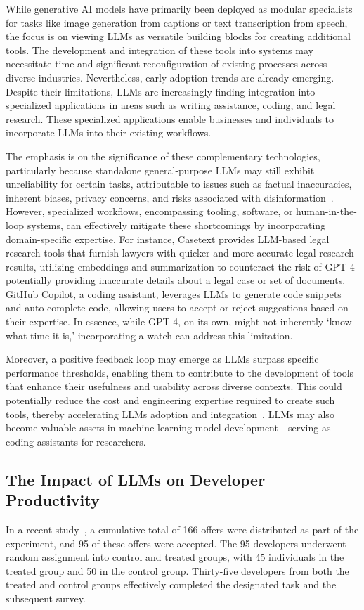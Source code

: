 \documentclass[12pt]{extarticle}
\begin{document}
While generative AI models have primarily been deployed as modular specialists for tasks like image generation from captions or text transcription from speech, the focus is on viewing LLMs as versatile building blocks for creating additional tools. The development and integration of these tools into systems may necessitate time and significant reconfiguration of existing processes across diverse industries. Nevertheless, early adoption trends are already emerging. Despite their limitations, LLMs are increasingly finding integration into specialized applications in areas such as writing assistance, coding, and legal research. These specialized applications enable businesses and individuals to incorporate LLMs into their existing workflows.

The emphasis is on the significance of these complementary technologies, particularly because standalone general-purpose LLMs may still exhibit unreliability for certain tasks, attributable to issues such as factual inaccuracies, inherent biases, privacy concerns, and risks associated with disinformation~\cite{abid2021persistent, schramowski2022large, goldstein2023generative}. However, specialized workflows, encompassing tooling, software, or human-in-the-loop systems, can effectively mitigate these shortcomings by incorporating domain-specific expertise. For instance, Casetext provides LLM-based legal research tools that furnish lawyers with quicker and more accurate legal research results, utilizing embeddings and summarization to counteract the risk of GPT-4 potentially providing inaccurate details about a legal case or set of documents. GitHub Copilot, a coding assistant, leverages LLMs to generate code snippets and auto-complete code, allowing users to accept or reject suggestions based on their expertise. In essence, while GPT-4, on its own, might not inherently `know what time it is,' incorporating a watch can address this limitation.

Moreover, a positive feedback loop may emerge as LLMs surpass specific performance thresholds, enabling them to contribute to the development of tools that enhance their usefulness and usability across diverse contexts. This could potentially reduce the cost and engineering expertise required to create such tools, thereby accelerating LLMs adoption and integration~\cite{chen2021evaluating, peng2023impact}. LLMs may also become valuable assets in machine learning model development—serving as coding assistants for researchers.

\subsection{The Impact of LLMs on Developer Productivity}
In a recent study~\cite{peng2023impact}, a cumulative total of 166 offers were distributed as part of the experiment, and 95 of these offers were accepted. The 95 developers underwent random assignment into control and treated groups, with 45 individuals in the treated group and 50 in the control group. Thirty-five developers from both the treated and control groups effectively completed the designated task and the subsequent survey.
\end{document}
